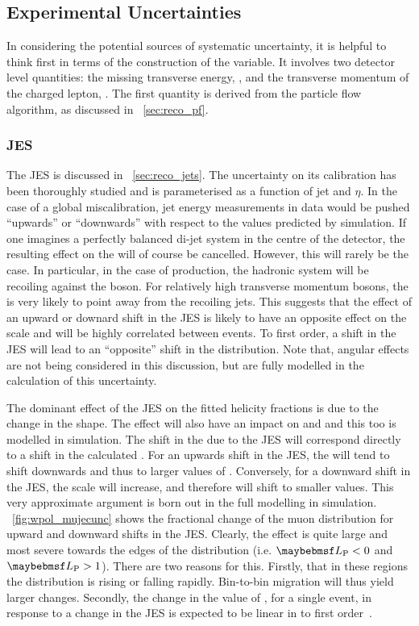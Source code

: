 \subsection{Experimental Uncertainties}
In considering the potential sources of systematic uncertainty, it is helpful to think
first in terms of the construction of the \LP variable. It involves two detector
level quantities: the missing transverse energy, \METv, and the transverse
momentum of the charged lepton, \Ptlv. The first quantity is derived from the
particle flow algorithm, as discussed in \sec~\ref{sec:reco_pf}.

\subsubsection{\acl{JES}}
\label{sec:wpol_syst_jec}
The \ac{JES} is discussed in \sec~\ref{sec:reco_jets}. The uncertainty on its
calibration has been thoroughly studied and is parameterised as a function of
jet \Pt and $\eta$. In the case of a global miscalibration, jet energy
measurements in data would be pushed ``upwards'' or ``downwards'' with respect
to the values predicted by simulation. If one imagines a perfectly balanced
di-jet system in the centre of the detector, the resulting effect on the \METv
will of course be cancelled. However, this will rarely be the case. In
particular, in the case of \Wjets production, the hadronic system will be
recoiling against the \PW boson. For relatively high transverse momentum \PW
bosons, the \METv is very likely to point away from the recoiling jets. This
suggests that the effect of an upward or downard shift in the \ac{JES} is likely
to have an opposite effect on the \METv scale and will be highly correlated
between events. To first order, a shift in the \ac{JES} will lead to an
``opposite'' shift in the \MET distribution. Note that, angular effects are not
being considered in this discussion, but are fully modelled in the calculation
of this uncertainty.

The dominant effect of the \ac{JES} on the fitted helicity fractions is due to
the change in the \LP shape. The effect will also have an impact on \PtW and \MT
and this too is modelled in simulation. The shift in the \MET due to the
\ac{JES} will correspond directly to a shift in the calculated \LP. For an
upwards shift in the \ac{JES}, the \MET will tend to shift downwards and thus to
larger values of \LP. Conversely, for a downward shift in the \ac{JES}, the \MET
scale will increase, and therefore \LP will shift to smaller values. This very
approximate argument is born out in the full modelling in
simulation. \fig~\ref{fig:wpol_mujecunc} shows the fractional change of the muon
\LP distribution for upward and downward shifts in the \ac{JES}. Clearly, the
effect is quite large and most severe towards the edges of the \LP distribution
(i.e. $\LP < 0$ and $\LP > 1$). There are two reasons for this. Firstly, that in
these regions the \LP distribution is rising or falling rapidly. Bin-to-bin
migration will thus yield larger changes. Secondly, the change in the value of
\LP, for a single event, in response to a change in the \ac{JES} is expected to
be linear in \LP to first order~\cite{susy_ra4_pas}.

